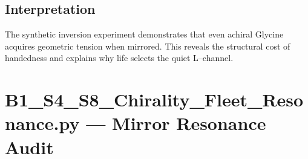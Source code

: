 \documentclass[11pt, letterpaper, openany]{book}
\begin{document}
\subsection*{Interpretation}

The synthetic inversion experiment demonstrates that even achiral Glycine
acquires geometric tension when mirrored. This reveals the structural cost of
handedness and explains why life selects the quiet L–channel.


\section{B1\_S4\_S8\_Chirality\_Fleet\_Resonance.py — Mirror Resonance Audit}
\end{document}
